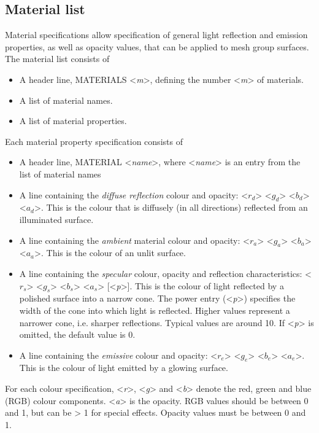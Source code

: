 \documentclass[Orbiter Developer Manual.tex]{subfiles}
\begin{document}
\subsection{Material list}
Material specifications allow specification of general light reflection and emission properties, as well as opacity values, that can be applied to mesh group surfaces. The material list consists of

\begin{itemize}
\item A header line, MATERIALS <\textit{m}>, defining the number <\textit{m}> of materials.
\item A list of material names.
\item A list of material properties.
\end{itemize}

\noindent
Each material property specification consists of

\begin{itemize}
\item A header line, MATERIAL <\textit{name}>, where <\textit{name}> is an entry from the list of material names
\item A line containing the \textit{diffuse reflection} colour and opacity: <$r_{d}$> <$g_{d}$> <$b_{d}$> <$a_{d}$>. This is the colour that is diffusely (in all directions) reflected from an illuminated surface.
\item A line containing the \textit{ambient} material colour and opacity: <$r_{a}$> <$g_{a}$> <$b_{a}$> <$a_{a}$>. This is the colour of an unlit surface.
\item A line containing the \textit{specular} colour, opacity and reflection characteristics: <$r_{s}$> <$g_{s}$> <$b_{s}$> <$a_{s}$> [<\textit{p}>]. This is the colour of light reflected by a polished surface into a narrow cone. The power entry (<\textit{p}>) specifies the width of the cone into which light is reflected. Higher values represent a narrower cone, i.e. sharper reflections. Typical values are around 10. If <\textit{p}> is omitted, the default value is 0.
\item A line containing the \textit{emissive} colour and opacity: <$r_{e}$> <$g_{e}$> <$b_{e}$> <$a_{e}$>. This is the colour of light emitted by a glowing surface.
\end{itemize}

\noindent
For each colour specification, <\textit{r}>, <\textit{g}> and <\textit{b}> denote the red, green and blue (RGB) colour components. <\textit{a}> is the opacity. RGB values should be between 0 and 1, but can be > 1 for special effects. Opacity values must be between 0 and 1.
\end{document}
